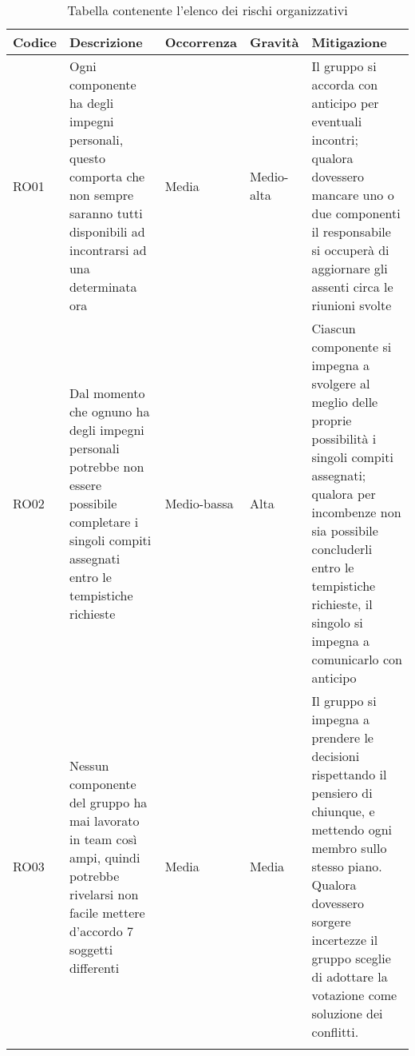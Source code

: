 \documentclass[../piano_di_progetto.tex]{subfiles}
\begin{document}
\begin{center}
	\begin{longtable}{|p{1.6cm}|p{3.5cm} | p{2cm}|p{2cm}|p{3.5cm}|}
		\hline
		\rowcolor{lightgray}
		{\textbf{Codice}} & {\textbf{Descrizione}} & {\textbf{Occorrenza}} & {\textbf{Gravità}} & {\textbf{Mitigazione}} \\

		\hline
			RO01 &
			Ogni componente ha degli impegni personali, questo comporta che non sempre saranno tutti disponibili ad incontrarsi ad una determinata ora
			&
			Media
			& 
			Medio-alta
			&
			Il gruppo si accorda con anticipo per eventuali incontri; qualora dovessero mancare uno o due componenti il responsabile si occuperà di aggiornare gli assenti circa le riunioni svolte \\	
			\hline
			RO02 &
			Dal momento che ognuno ha degli impegni personali potrebbe non essere possibile completare i singoli compiti assegnati entro le tempistiche richieste
			&
			Medio-bassa
			& 
			Alta
			& 
			Ciascun componente si impegna a svolgere al meglio delle proprie possibilità i singoli compiti assegnati; qualora per incombenze non sia possibile concluderli entro le tempistiche richieste, il singolo si impegna a comunicarlo con anticipo\\
			\hline
			RO03 &
			Nessun componente del gruppo ha mai lavorato in team così ampi, quindi potrebbe rivelarsi non facile mettere d’accordo 7 soggetti differenti
			&
			Media
			&
			Media
			&
			Il gruppo si impegna a prendere le decisioni rispettando il pensiero di chiunque, e mettendo ogni membro sullo stesso piano. Qualora dovessero sorgere incertezze il gruppo sceglie di adottare la votazione come soluzione dei conflitti. \\
\hline
\rowcolor{white}
\caption{Tabella contenente l'elenco dei rischi organizzativi}
	\end{longtable}

\end{center}
\end{document}
